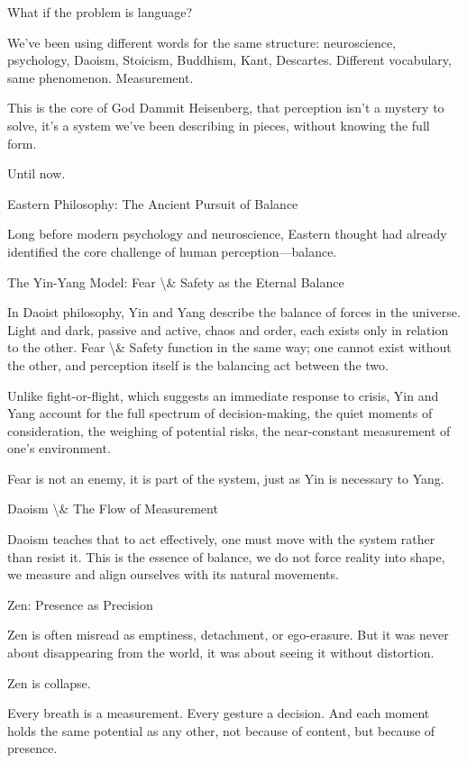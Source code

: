 \documentclass[12pt]{article}
\begin{document}
What if the problem is language?

We’ve been using different words for the same structure: neuroscience, psychology, Daoism, Stoicism, Buddhism, Kant, Descartes. Different vocabulary, same phenomenon. Measurement.

This is the core of God Dammit Heisenberg, that perception isn’t a mystery to solve, it’s a system we’ve been describing in pieces, without knowing the full form.

Until now.

Eastern Philosophy: The Ancient Pursuit of Balance

Long before modern psychology and neuroscience, Eastern thought had already identified the core challenge of human perception—balance.

The Yin-Yang Model: Fear \textbackslash{}& Safety as the Eternal Balance

In Daoist philosophy, Yin and Yang describe the balance of forces in the universe. Light and dark, passive and active, chaos and order, each exists only in relation to the other. Fear \textbackslash{}& Safety function in the same way; one cannot exist without the other, and perception itself is the balancing act between the two.

Unlike fight-or-flight, which suggests an immediate response to crisis, Yin and Yang account for the full spectrum of decision-making, the quiet moments of consideration, the weighing of potential risks, the near-constant measurement of one's environment.

Fear is not an enemy, it is part of the system, just as Yin is necessary to Yang.

Daoism \textbackslash{}& The Flow of Measurement

Daoism teaches that to act effectively, one must move with the system rather than resist it. This is the essence of balance, we do not force reality into shape, we measure and align ourselves with its natural movements.

Zen: Presence as Precision

Zen is often misread as emptiness, detachment, or ego-erasure. But it was never about disappearing from the world, it was about seeing it without distortion.

Zen is collapse.

Every breath is a measurement. Every gesture a decision.
And each moment holds the same potential as any other, not because of content, but because of presence.
\end{document}
